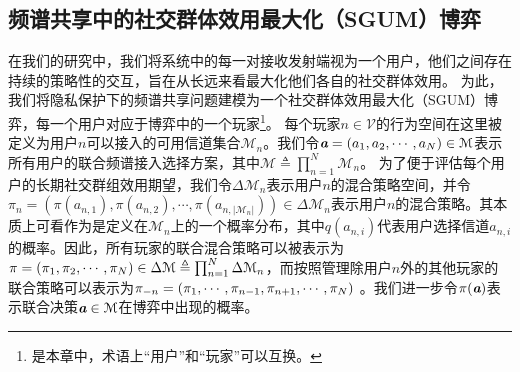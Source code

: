 \subsection{频谱共享中的社交群体效用最大化（SGUM）博弈}\label{sec:SGUM}
在我们的研究中，我们将系统中的每一对接收发射端视为一个用户，他们之间存在持续的策略性的交互，旨在从长远来看最大化他们各自的社交群体效用。
为此，我们将隐私保护下的频谱共享问题建模为一个社交群体效用最大化（SGUM）博弈，每一个用户对应于博弈中的一个玩家\footnote{是本章中，术语上“用户”和“玩家”可以互换。}。
每个玩家$n\in\mathcal{V}$的行为空间在这里被定义为用户$n$可以接入的可用信道集合$\mathcal{M}_n$。我们令$\emph{\textbf{a}}=(a_1,a_2,\cdots,a_N)\in\mathcal{M}$表示所有用户的联合频谱接入选择方案，其中$\mathcal{M}\triangleq\prod_{n=1}^N\mathcal{M}_n$。
为了便于评估每个用户的长期社交群组效用期望，我们令$\Delta\mathcal{M}_n$表示用户$n$的混合策略空间，并令$\pi_n=\left(\pi(a_{n,1}),\pi(a_{n,2}),\cdots,\pi(a_{n,|\mathcal{M}_n|})\right)\in\Delta\mathcal{M}_n$表示用户$n$的混合策略。其本质上可看作为是定义在$\mathcal{M}_n$上的一个概率分布，其中$q(a_{n,i})$代表用户选择信道$a_{n,i}$的概率。因此，所有玩家的联合混合策略可以被表示为$\pi=(\pi_1,\pi_2,\cdots,\pi_N)\in\Delta\mathcal{M}\triangleq\prod_{n=1}^N\Delta\mathcal{M}_n$，而按照管理除用户$n$外的其他玩家的联合策略可以表示为$\pi_{-n}=(\pi_1,\cdots,\pi_{n-1},\pi_{n+1},\cdots,\pi_N)$ 。我们进一步令$\pi(\emph{\textbf{a}})$表示联合决策$\emph{\textbf{a}}\in\mathcal{M}$在博弈中出现的概率。


